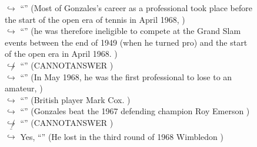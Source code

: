 \documentclass[11pt,a4paper, onecolumn]{article}
\begin{document}
\begin{figure}[t] \small \begin{tcolorbox}[boxsep=0pt,left=5pt,right=0pt,top=2pt,colback = yellow!5] \begin{dialogue}
 \small 
\colorbox{pink!25}{$\hookrightarrow$}
{ ``'' (Most of Gonzales's career as a professional took place before the start of the open era of tennis in April 1968, ) }
\\
\colorbox{pink!25}{$\hookrightarrow$}
{ ``'' (he was therefore ineligible to compete at the Grand Slam events between the end of 1949 (when he turned pro) and the start of the open era in April 1968. ) }
\\
\colorbox{pink!25}{$\not\hookrightarrow$}
{ ``'' (CANNOTANSWER ) }
\\
\colorbox{pink!25}{$\hookrightarrow$}
{ ``'' (In May 1968, he was the first professional to lose to an amateur, ) }
\\
\colorbox{pink!25}{$\hookrightarrow$}
{ ``'' (British player Mark Cox. ) }
\\
\colorbox{pink!25}{$\hookrightarrow$}
{ ``'' (Gonzales beat the 1967 defending champion Roy Emerson ) }
\\
\colorbox{pink!25}{$\not\hookrightarrow$}
{ ``'' (CANNOTANSWER ) }
\\
\colorbox{pink!25}{ $\bar{\hookrightarrow}$}
\colorbox{red!25}{Yes,}
{ ``'' (He lost in the third round of 1968 Wimbledon ) }
\\
 \end{dialogue}\end{tcolorbox}\end{figure}
\end{document}
